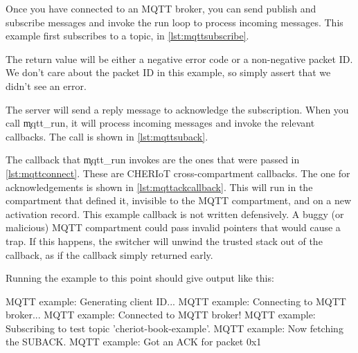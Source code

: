 {Once you have connected to an MQTT broker, you can send publish and subscribe messages and invoke the run loop to process incoming messages.
This example first subscribes to a topic, in \ref{lst:mqttsubscribe}.

\codelisting[filename=examples/mqtt/mqtt.cc,marker=subscribe,label=lst:mqttsubscribe,caption="Subscribing to an MQTT topic."]{}

The return value will be either a negative error code or a non-negative packet ID.
We don't care about the packet ID in this example, so simply assert that we didn't see an error.


The server will send a reply message to acknowledge the subscription.
When you call \c{mqtt_run}, it will process incoming messages and invoke the relevant callbacks.
The call is shown in \ref{lst:mqttsuback}.

\codelisting[filename=examples/mqtt/mqtt.cc,marker=suback,label=lst:mqttsuback,caption="Waiting for acknowledgement after subscribing to an MQTT topic."]{}

The callback that \c{mqtt_run} invokes are the ones that were passed in \ref{lst:mqttconnect}.
These are CHERIoT cross-compartment callbacks.
The one for acknowledgements is shown in \ref{lst:mqttackcallback}.
This will run in the compartment that defined it, invisible to the MQTT compartment, and on a new  activation record.
This example callback is not written defensively.
A buggy (or malicious) MQTT compartment could pass invalid pointers that would cause a trap.
If this happens, the switcher will unwind the trusted stack out of the callback, as if the callback simply returned early.

\codelisting[filename=examples/mqtt/mqtt.cc,marker=ack_callback,label=lst:mqttackcallback,caption="Callback for acknowledging MQTT messages."]{}

Running the example to this point should give output like this:

\begin{console}
MQTT example: Generating client ID...
MQTT example: Connecting to MQTT broker...
MQTT example: Connected to MQTT broker!
MQTT example: Subscribing to test topic 'cheriot-book-example'.
MQTT example: Now fetching the SUBACK.
MQTT example: Got an ACK for packet 0x1
\end{console}

}
